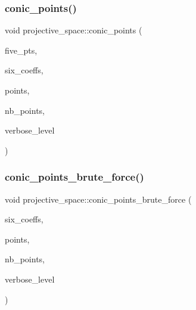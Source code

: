 \subsubsection{\texorpdfstring{conic\+\_\+points()}{conic\_points()}}
{\footnotesize\ttfamily void projective\+\_\+space\+::conic\+\_\+points (\begin{DoxyParamCaption}\item[{\mbox{\hyperlink{galois_8h_a09fddde158a3a20bd2dcadb609de11dc}{I\+NT}} $\ast$}]{five\+\_\+pts,  }\item[{\mbox{\hyperlink{galois_8h_a09fddde158a3a20bd2dcadb609de11dc}{I\+NT}} $\ast$}]{six\+\_\+coeffs,  }\item[{\mbox{\hyperlink{galois_8h_a09fddde158a3a20bd2dcadb609de11dc}{I\+NT}} $\ast$}]{points,  }\item[{\mbox{\hyperlink{galois_8h_a09fddde158a3a20bd2dcadb609de11dc}{I\+NT}} \&}]{nb\+\_\+points,  }\item[{\mbox{\hyperlink{galois_8h_a09fddde158a3a20bd2dcadb609de11dc}{I\+NT}}}]{verbose\+\_\+level }\end{DoxyParamCaption})}

\mbox{\label{classprojective__space_af4a32fbd4850227dd2dd12b095d4967f}} 
\subsubsection{\texorpdfstring{conic\+\_\+points\+\_\+brute\+\_\+force()}{conic\_points\_brute\_force()}}
{\footnotesize\ttfamily void projective\+\_\+space\+::conic\+\_\+points\+\_\+brute\+\_\+force (\begin{DoxyParamCaption}\item[{\mbox{\hyperlink{galois_8h_a09fddde158a3a20bd2dcadb609de11dc}{I\+NT}} $\ast$}]{six\+\_\+coeffs,  }\item[{\mbox{\hyperlink{galois_8h_a09fddde158a3a20bd2dcadb609de11dc}{I\+NT}} $\ast$}]{points,  }\item[{\mbox{\hyperlink{galois_8h_a09fddde158a3a20bd2dcadb609de11dc}{I\+NT}} \&}]{nb\+\_\+points,  }\item[{\mbox{\hyperlink{galois_8h_a09fddde158a3a20bd2dcadb609de11dc}{I\+NT}}}]{verbose\+\_\+level }\end{DoxyParamCaption})}

